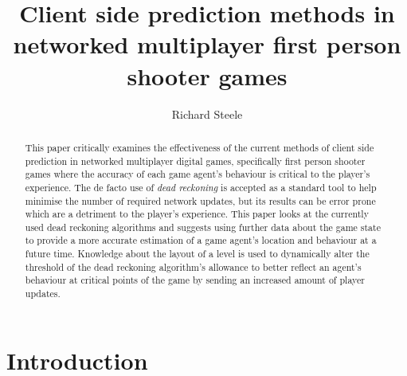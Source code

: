 \documentclass[journal]{IEEEtran}
\begin{document}
%
\title{Client side prediction methods in networked multiplayer first person shooter games}
%
%
\author{Richard Steele}


\maketitle

\begin{abstract}
This paper critically examines the effectiveness of the current methods of client side prediction in networked multiplayer digital games, specifically first person shooter games where the accuracy of each game agent's behaviour is critical to the player's experience. The de facto use of \textit{dead reckoning} is accepted as a standard tool to help minimise the number of required network updates, but its results can be error prone which are a detriment to the player's experience. This paper looks at the currently used dead reckoning algorithms and suggests using further data about the game state to provide a more accurate estimation of a game agent's location and behaviour at a future time. Knowledge about the layout of a level is used to dynamically alter the threshold of the dead reckoning algorithm's allowance to better reflect an agent's behaviour at critical points of the game by sending an increased amount of player updates.
\end{abstract}

\section{Introduction}
% 
% 
% 
\end{document}
